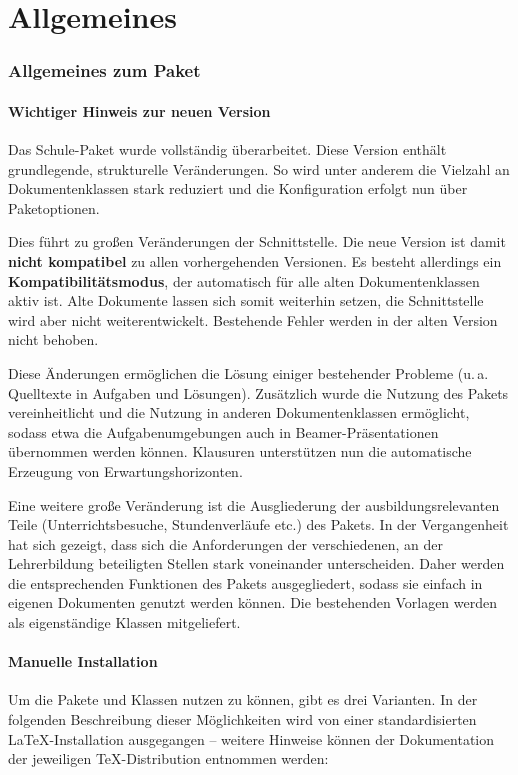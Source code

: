 \part{Allgemeines}

\section{Allgemeines zum Paket}

\subsection{Wichtiger Hinweis zur neuen Version}
	Das Schule-Paket wurde vollständig überarbeitet. Diese
	Version enthält grundlegende, strukturelle Veränderungen.
	So wird unter anderem die Vielzahl an Dokumentenklassen
	stark reduziert und die Konfiguration erfolgt nun über
	Paketoptionen.

	Dies führt zu großen Veränderungen der Schnittstelle. Die
	neue Version ist damit \textbf{nicht kompatibel} zu allen
	vorhergehenden Versionen. Es besteht allerdings ein
	\textbf{Kompatibilitätsmodus}, der automatisch für alle alten
	Dokumentenklassen aktiv ist. Alte Dokumente lassen sich somit
	weiterhin setzen, die Schnittstelle wird aber nicht
	weiterentwickelt. Bestehende Fehler werden in der alten
	Version nicht behoben.

	Diese Änderungen ermöglichen die Lösung einiger bestehender
	Probleme (u.\,a. Quelltexte in Aufgaben und Lösungen).
	Zusätzlich wurde die Nutzung des Pakets vereinheitlicht und
	die Nutzung in anderen Dokumentenklassen ermöglicht, sodass
	etwa die Aufgabenumgebungen auch in Beamer-Präsentationen
	übernommen werden können. Klausuren unterstützen nun die
	automatische Erzeugung von Erwartungshorizonten.

	Eine weitere große Veränderung ist die Ausgliederung der
	ausbildungsrelevanten Teile (Unterrichtsbesuche,
	Stundenverläufe etc.) des Pakets. In der
	Vergangenheit hat sich gezeigt, dass sich die Anforderungen der
	verschiedenen, an der Lehrerbildung beteiligten Stellen
	stark voneinander unterscheiden.
	Daher werden die entsprechenden Funktionen des Pakets
	ausgegliedert, sodass sie einfach in eigenen Dokumenten
	genutzt werden können. Die bestehenden Vorlagen werden
	als eigenständige Klassen mitgeliefert.

\subsection{Manuelle Installation}
	Um die Pakete und Klassen nutzen zu können, gibt es drei
	Varianten. In der folgenden Beschreibung dieser Möglichkeiten
	wird von einer standardisierten \LaTeX-Installation
	ausgegangen -- weitere Hinweise können der Dokumentation der
	jeweiligen \TeX-Distribution entnommen werden:


